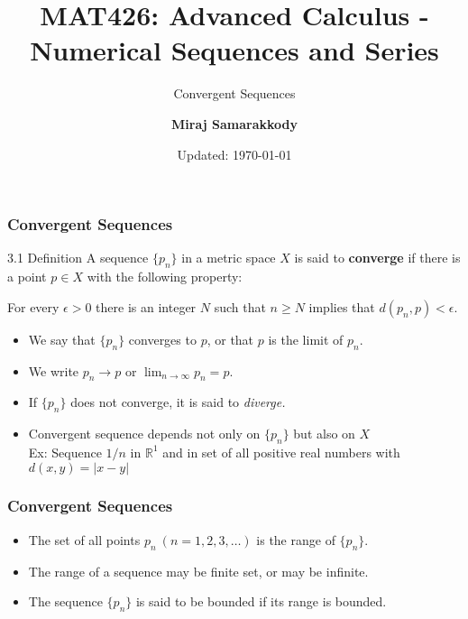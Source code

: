 \documentclass{beamer}
\title{MAT426: Advanced Calculus - Numerical Sequences and Series}
\subtitle{Convergent Sequences}
\author{\textbf{Miraj Samarakkody}}
\institute{Tougaloo College}
\date{Updated: \today}
\begin{document}
\begin{frame}
    \titlepage
\end{frame}





    \begin{frame}
        \frametitle{Convergent Sequences}
    
        \begin{block}{3.1 Definition}
            A sequence \(\{p_n\}\) in a metric space \(X\) is said to \textbf{converge} if there is a point \(p \in X\) with the following property: \\
            \vspace{0.2in}

            For every \(\epsilon>0\) there is an integer \(N\) such that \(n\geq N\) implies that \(d(p_n,p) < \epsilon\). 
        \end{block} \pause 
        \begin{itemize}
            \item We say that \(\{p_n\}\) converges to \(p\), or that \(p\) is the limit of \(p_n\). \pause
            \item We write \(p_n \to p \) or \(\lim_{n \to \infty}p_n =p\). \pause
            \item If \(\{p_n\}\) does not converge, it is said to \textit{diverge.}\pause
            \item Convergent sequence depends not only on \(\{p_n\}\) but also on \(X\)\\
            Ex: Sequence \(1/n\) in \(\mathbb{R}^1\) and in set of all positive real numbers with \(d(x,y)=|x-y|\)
        \end{itemize}
    \end{frame}

\begin{frame}
    \frametitle{Convergent Sequences}

    \begin{itemize}
        \item The set of all points \(p_n~(n=1,2,3, \dots)\) is the range of \(\{p_n\}. \)
        \item The range of a sequence may be finite set, or may be infinite. 
        \item The sequence \(\{p_n\}\) is said to be bounded if its range is bounded. 
    \end{itemize}

\end{frame}
\end{document}
